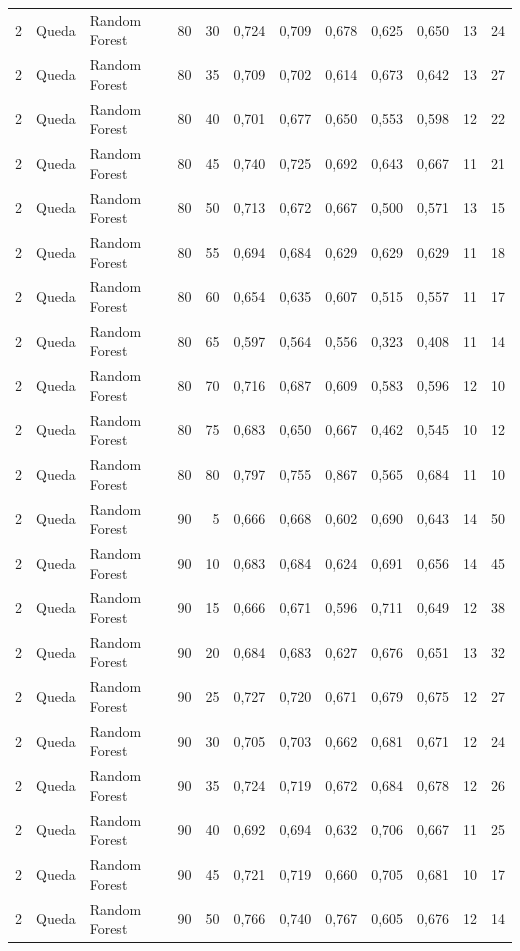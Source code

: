 \begin{longtable}{@{}rllrrrrrrrrr@{}}
2 & Queda & Random Forest & 80 & 30 & 0,724 & 0,709 & 0,678 & 0,625 & 0,650 & 13 & 24 \\
2 & Queda & Random Forest & 80 & 35 & 0,709 & 0,702 & 0,614 & 0,673 & 0,642 & 13 & 27 \\
2 & Queda & Random Forest & 80 & 40 & 0,701 & 0,677 & 0,650 & 0,553 & 0,598 & 12 & 22 \\
2 & Queda & Random Forest & 80 & 45 & 0,740 & 0,725 & 0,692 & 0,643 & 0,667 & 11 & 21 \\
2 & Queda & Random Forest & 80 & 50 & 0,713 & 0,672 & 0,667 & 0,500 & 0,571 & 13 & 15 \\
2 & Queda & Random Forest & 80 & 55 & 0,694 & 0,684 & 0,629 & 0,629 & 0,629 & 11 & 18 \\
2 & Queda & Random Forest & 80 & 60 & 0,654 & 0,635 & 0,607 & 0,515 & 0,557 & 11 & 17 \\
2 & Queda & Random Forest & 80 & 65 & 0,597 & 0,564 & 0,556 & 0,323 & 0,408 & 11 & 14 \\
2 & Queda & Random Forest & 80 & 70 & 0,716 & 0,687 & 0,609 & 0,583 & 0,596 & 12 & 10 \\
2 & Queda & Random Forest & 80 & 75 & 0,683 & 0,650 & 0,667 & 0,462 & 0,545 & 10 & 12 \\
2 & Queda & Random Forest & 80 & 80 & 0,797 & 0,755 & 0,867 & 0,565 & 0,684 & 11 & 10 \\
2 & Queda & Random Forest & 90 & 5 & 0,666 & 0,668 & 0,602 & 0,690 & 0,643 & 14 & 50 \\
2 & Queda & Random Forest & 90 & 10 & 0,683 & 0,684 & 0,624 & 0,691 & 0,656 & 14 & 45 \\
2 & Queda & Random Forest & 90 & 15 & 0,666 & 0,671 & 0,596 & 0,711 & 0,649 & 12 & 38 \\
2 & Queda & Random Forest & 90 & 20 & 0,684 & 0,683 & 0,627 & 0,676 & 0,651 & 13 & 32 \\
2 & Queda & Random Forest & 90 & 25 & 0,727 & 0,720 & 0,671 & 0,679 & 0,675 & 12 & 27 \\
2 & Queda & Random Forest & 90 & 30 & 0,705 & 0,703 & 0,662 & 0,681 & 0,671 & 12 & 24 \\
2 & Queda & Random Forest & 90 & 35 & 0,724 & 0,719 & 0,672 & 0,684 & 0,678 & 12 & 26 \\
2 & Queda & Random Forest & 90 & 40 & 0,692 & 0,694 & 0,632 & 0,706 & 0,667 & 11 & 25 \\
2 & Queda & Random Forest & 90 & 45 & 0,721 & 0,719 & 0,660 & 0,705 & 0,681 & 10 & 17 \\
2 & Queda & Random Forest & 90 & 50 & 0,766 & 0,740 & 0,767 & 0,605 & 0,676 & 12 & 14 \\

\end{longtable}
